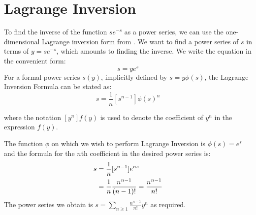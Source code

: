 \documentclass[reqno]{amsart}
\def\be{\begin{equation}}
\def\ee{\end{equation}}
\numberwithin{equation}{section}
\begin{document}
\appendix
\section{Lagrange Inversion}
To find the inverse of the function $se^{-s}$ as a power series, we can use the one-dimensional Lagrange inversion form from \cite{MSV06}. We want to find a power series of $s$ in terms of $y=se^{-s}$, which amounts to finding the inverse. We write the equation in the convenient form:
\be s=ye^s \ee
For a formal power series $s(y)$, implicitly defined by $s=y\phi(s)$, the Lagrange Inversion Formula can be stated as:
\be [y^n]s = \frac{1}{n} [s^{n-1}]\phi(s)^n \ee
 
where the notation $[y^n]f(y)$ is used to denote the coefficient of $y^n$ in the expression $f(y)$.

The function $\phi$ on which we wish to perform Lagrange Inversion is $\phi(s)=e^s$ and the formula for the $n$th coefficient in the desired power series is:
\begin{align} [y^n]s &=\frac{1}{n}[s^{n-1}]e^{ns} \notag \\
&=\frac{1}{n} \frac{n^{n-1}}{(n-1)!} = \frac{n^{n-1}}{n!} 
\end{align}
The power series we obtain is $s = \sum\limits_{n \geq 1} \frac{n^{n-1}}{n!}y^n$ as required.
\end{document}
